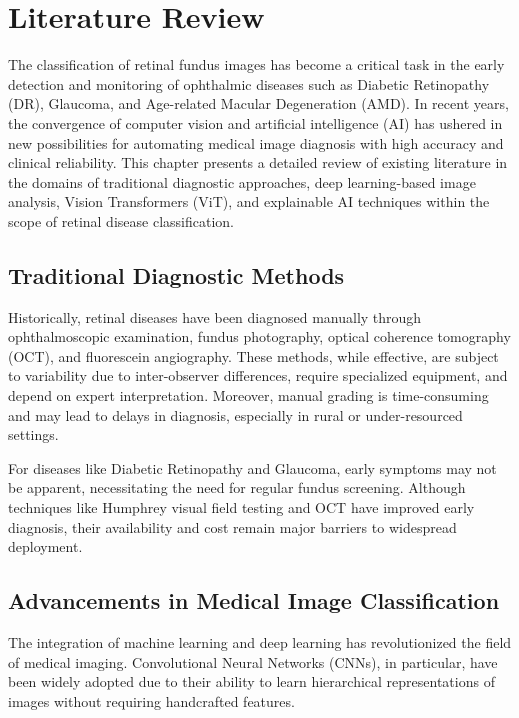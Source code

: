 \documentclass[a4paper,12pt]{report}
\begin{document}
\chapter{Literature Review}

The classification of retinal fundus images has become a critical task in the early detection and monitoring of ophthalmic diseases such as Diabetic Retinopathy (DR), Glaucoma, and Age-related Macular Degeneration (AMD). In recent years, the convergence of computer vision and artificial intelligence (AI) has ushered in new possibilities for automating medical image diagnosis with high accuracy and clinical reliability. This chapter presents a detailed review of existing literature in the domains of traditional diagnostic approaches, deep learning-based image analysis, Vision Transformers (ViT), and explainable AI techniques within the scope of retinal disease classification.

\section*{Traditional Diagnostic Methods}

Historically, retinal diseases have been diagnosed manually through ophthalmoscopic examination, fundus photography, optical coherence tomography (OCT), and fluorescein angiography. These methods, while effective, are subject to variability due to inter-observer differences, require specialized equipment, and depend on expert interpretation. Moreover, manual grading is time-consuming and may lead to delays in diagnosis, especially in rural or under-resourced settings.

For diseases like Diabetic Retinopathy and Glaucoma, early symptoms may not be apparent, necessitating the need for regular fundus screening. Although techniques like Humphrey visual field testing and OCT have improved early diagnosis, their availability and cost remain major barriers to widespread deployment.

\section*{Advancements in Medical Image Classification}

The integration of machine learning and deep learning has revolutionized the field of medical imaging. Convolutional Neural Networks (CNNs), in particular, have been widely adopted due to their ability to learn hierarchical representations of images without requiring handcrafted features.
\end{document}
